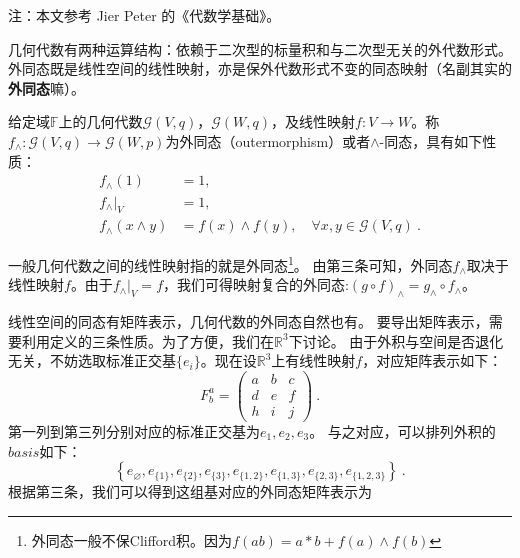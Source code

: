 


注：本文参考 Jier Peter 的《代数学基础》。

几何代数有两种运算结构：依赖于二次型的标量积和与二次型无关的外代数形式。外同态既是线性空间的线性映射，亦是保外代数形式不变的同态映射（名副其实的\textbf{外同态}嘛）。
\begin{definition}{}
给定域$\mathbb F$上的几何代数$\mathcal G(V,q)$，$\mathcal G(W,q)$，及线性映射$f:V\rightarrow W$。称$f_{\wedge}:\mathcal G(V,q)\rightarrow \mathcal G(W,p)$为外同态（outermorphism）或者$\wedge$-同态，具有如下性质：
\begin{equation}
\begin{aligned}
f_\wedge(1)&=1,\\
f_\wedge|_V&=1,\\
f_\wedge(x\wedge y)&=f(x)\wedge f(y),\quad\forall x,y\in\mathcal G(V,q)~.
\end{aligned}
\end{equation}
\end{definition}
一般几何代数之间的线性映射指的就是外同态\footnote{外同态一般不保Clifford积。因为$f(ab)=a* b+f(a)\wedge f(b)$}。
由第三条可知，外同态$f_{\wedge}$取决于线性映射$f$。由于$f_{\wedge}|_V=f$，我们可得映射复合的外同态:$(g\circ f)_{\wedge}=g_{\wedge} \circ f_\wedge$。

线性空间的同态有矩阵表示，几何代数的外同态自然也有。
要导出矩阵表示，需要利用定义的三条性质。为了方便，我们在$\mathbb R^3$下讨论。
由于外积与空间是否退化无关，不妨选取标准正交基$\{e_i\}$。现在设$\mathbb R^3$上有线性映射$f$，对应矩阵表示如下：
\begin{equation}
F_b^a=\left(\begin{array}{lll}
a & b & c \\
d & e & f \\
h & i & j
\end{array}\right)~.
\end{equation}
第一列到第三列分别对应的标准正交基为$e_1,e_2,e_3$。
与之对应，可以排列外积的$basis$如下：
$$
\left\{e_{\varnothing}, e_{\{1\}}, e_{\{2\}}, e_{\{3\}}, e_{\{1,2\}}, e_{\{1,3\}}, e_{\{2,3\}}, e_{\{1,2,3\}}\right\}~.
$$
根据第三条，我们可以得到这组基对应的外同态矩阵表示为

